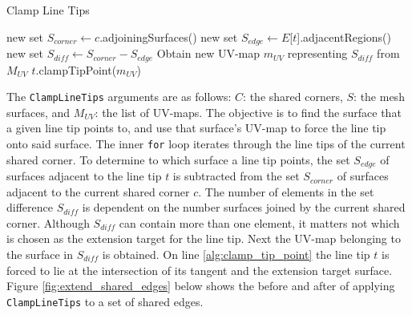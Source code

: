 \begin{algorithm}[hb]
\caption{Clamp Line Tips}\label{alg:clamp_line_tips}
\begin{algorithmic}[1]
		\State new set $S_{corner} \leftarrow c$.adjoiningSurfaces() 
			\State new set $S_{edge} \leftarrow E$[$t$].adjacentRegions()
			\State new set $S_{diff} \leftarrow S_{corner} - S_{edge}$ 
			\State Obtain new UV-map $m_{UV}$ representing $S_{diff}$ from $M_{UV}$
			\State $t$.clampTipPoint($m_{UV}$)\label{alg:clamp_tip_point}
		\EndFor
	\EndFor
\EndFunction
\end{algorithmic}
\end{algorithm}

The \verb|ClampLineTips| arguments are as follows:
$C$: the shared corners, $S$: the mesh surfaces, and $M_{UV}$: the list of UV-maps.
The objective is to find the surface that a given line tip points to, and use that surface's UV-map to force the line tip onto said surface.
The inner \verb|for| loop iterates through the line tips of the current shared corner.
To determine to which surface a line tip points, the set $S_{edge}$ of surfaces adjacent to the line tip $t$ is subtracted from the set $S_{corner}$ of surfaces adjacent to the current shared corner $c$.
The number of elements in the set difference $S_{diff}$ is dependent on the number surfaces joined by the current shared corner.
Although $S_{diff}$ can contain more than one element, it matters not which is chosen as the extension target for the line tip.
Next the UV-map belonging to the surface in $S_{diff}$ is obtained.
On line \ref{alg:clamp_tip_point} the line tip $t$ is forced to lie at the intersection of its tangent and the extension target surface.
Figure \ref{fig:extend_shared_edges} below shows the before and after of applying \verb|ClampLineTips| to a set of shared edges.


